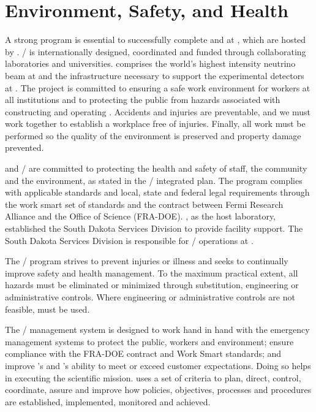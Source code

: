 \chapter{Environment, Safety, and Health}
\label{vl:tc-ESH}


A strong  program is essential to successfully complete
 and  at , which are hosted by
\fnal.  / is internationally designed,
coordinated and funded through collaborating laboratories and
universities.   comprises the
world's highest intensity neutrino beam at \fnal and the
infrastructure necessary to support the experimental detectors at
. The  project is committed to ensuring a
safe work environment for  workers at all
institutions and to protecting the public from hazards associated with
constructing and operating .  Accidents and
injuries are preventable, and we must work together to
establish a workplace free of injuries.  Finally, all work must be
performed so the quality of the environment is preserved
and property damage prevented.

\fnal and / are committed to protecting the health and
safety of staff, the community and the environment, as stated in the
/ integrated  plan.  The
 program complies with applicable standards and local,
state and federal legal requirements through the \fnal work smart set
of standards and the contract between Fermi Research Alliance and the
 Office of Science (FRA-DOE). \fnal, as the host
laboratory, established the South Dakota Services Division to provide
facility support.  The South Dakota Services Division is responsible
for / operations at .

The /  program strives to prevent
injuries or illness and seeks to continually improve safety and health
management.  To the maximum practical extent, all hazards must be
eliminated or minimized through substitution, engineering or
administrative controls.  Where engineering or administrative controls
are not feasible,  must be used.

The /  management system is
designed to work hand in hand with the  emergency
management systems to protect the public, workers and environment;
ensure compliance with the FRA-DOE contract and \fnal Work Smart
standards; and improve \fnal's and 's ability to meet or
exceed customer expectations. Doing so helps in executing the
scientific mission.  \fnal uses a set of criteria to plan, direct,
control, coordinate, assure and improve how  policies,
objectives, processes and procedures are established, implemented,
monitored and achieved.

